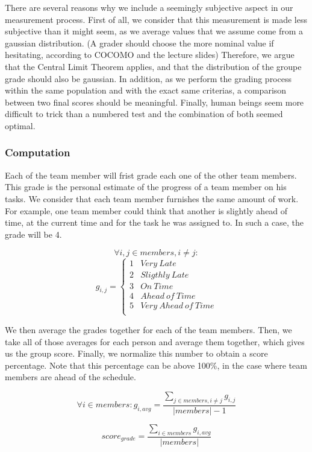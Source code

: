 \documentclass[]{article}
\begin{document}
There are several reasons why we include a seemingly subjective aspect in our measurement process. First of all, we consider that this measurement is made less subjective than it might seem, as we average values that we assume come from a gaussian distribution. (A grader should choose the more nominal value if hesitating, according to COCOMO and the lecture slides) Therefore, we argue that the Central Limit Theorem applies, and that the distribution of the groupe grade should also be gaussian. In addition, as we perform the grading process within the same population and with the exact same criterias, a comparison between two final scores should be meaningful. Finally, human beings seem more difficult to trick than a numbered test and the combination of both seemed optimal.

\subsubsection{Computation}\label{computation}
Each of the team member will frist grade each one of the other team members. This grade is the personal estimate of the progress of a team member on his tasks. We consider that each team member furnishes the same amount of work. For example, one team member could think that another is slightly ahead of time, at the current time and for the task he was assigned to. In such a case, the grade will be 4.

$$
\forall i, j \in members, i \not= j :
$$
$$
g_{i, j} = 
\begin{cases}
1 &  Very\ Late \\
2 & Sligthly\ Late \\
3 & On\ Time \\
4 & Ahead\ of\ Time \\
5 & Very\ Ahead\ of\ Time \\
\end{cases}
$$

We then average the grades together for each of the team members. Then, we take all of those averages for each person and average them together, which gives us the group score. Finally, we normalize this number to obtain a score percentage. Note that this percentage can be above 100\%, in the case where team members are ahead of the schedule.

$$
\forall i \in members:
g_{i, avg} = \frac{\sum_{j \in members, i \not= j} g_{i, j}}{|members| -1}
$$

$$
score_{grade} = \frac{\sum_{i \in members} g_{i, avg}}{|members|}
$$
\end{document}
